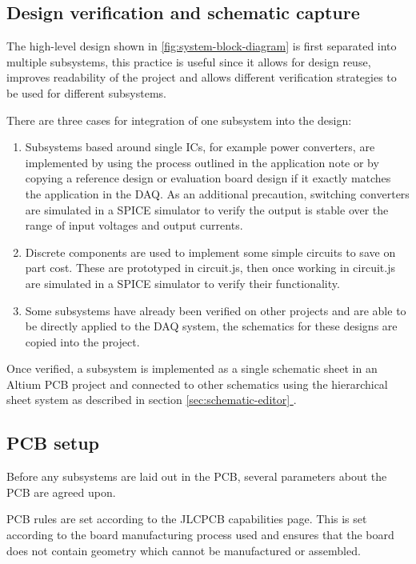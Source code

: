 \documentclass[]{report}
\newcommand*{\secref}[1]{section \hyperref[{#1}]{\ref*{#1} \nameref*{#1}}}
\begin{document}

\subsection{Design verification and schematic capture}

The high-level design shown in \ref{fig:system-block-diagram} is first separated into multiple subsystems, this practice is useful since it allows for design reuse, improves readability of the project and allows different verification strategies to be used for different subsystems.

There are three cases for integration of one subsystem into the design:

\begin{enumerate}
  \item Subsystems based around single ICs, for example power converters, are implemented by using the process outlined in the  application note or by copying a reference design or evaluation board design if it exactly matches the application in the DAQ. As an additional precaution, switching converters are simulated in a SPICE simulator to verify the output is stable over the range of input voltages and output currents.
  \item Discrete components are used to implement some simple circuits to save on part cost. These are prototyped in circuit.js, then once working in circuit.js are simulated in a SPICE simulator to verify their functionality.
  \item Some subsystems have already been verified on other projects and are able to be directly applied to the DAQ system, the schematics for these designs are copied into the project.
\end{enumerate}

Once verified, a subsystem is implemented as a single schematic sheet in an Altium PCB project and connected to other schematics using the hierarchical sheet system as described in \secref{sec:schematic-editor}.

\subsection{PCB setup}

Before any subsystems are laid out in the PCB, several parameters about the PCB are agreed upon.

PCB rules are set according to the JLCPCB capabilities page. This is set according to the board manufacturing process used and ensures that the board does not contain geometry which cannot be manufactured or assembled.
\end{document}
